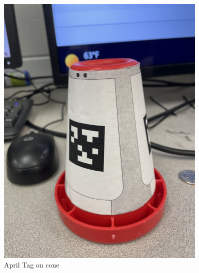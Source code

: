 \begin{figure}[htp]
\centering
\includegraphics[width=0.9\textwidth, angle=270]{Meetings/December/12-08-22/AprilTag.jpg}
\caption{April Tag on cone}
\label{fig:082322}
\end{figure}




